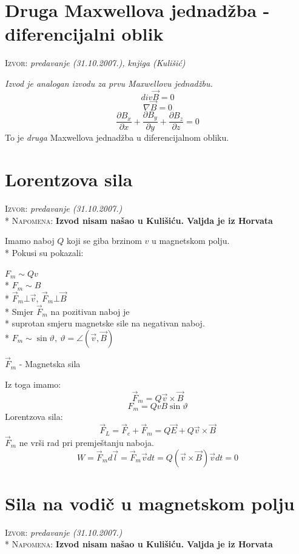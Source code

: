 \documentclass{report}
\begin{document}
\section{Druga Maxwellova jednadžba - diferencijalni oblik}
\small \textsc{Izvor:} \textit{predavanje (31.10.2007.), knjiga (Kulišić)}

\textit{Izvod je analogan izvodu za prvu Maxwellovu jednadžbu.}
$$div \vec{B} = 0$$
$$\nabla \vec{B} = 0$$
$$\frac{\partial B _x}{\partial x} + \frac{\partial B _y}{\partial y} + \frac{\partial B _z}{\partial z} = 0$$
To je \textit{druga} Maxwellova jednadžba u diferencijalnom obliku.

\section{Lorentzova sila}
\small \textsc{Izvor:} \textit{predavanje (31.10.2007.)}\\*
\small \textsc{Napomena:} \textbf{Izvod nisam našao u Kulišiću. Valjda je iz Horvata}

Imamo naboj $Q$ koji se giba brzinom $v$ u magnetskom polju.\\*
Pokusi su pokazali:
\begin{center} {
	$F _m \sim Qv$\\*
	$F _m \sim B$\\*
	$\vec{F} _m \bot \vec{v}, \: \vec{F} _m \bot \vec{B}$\\*
	Smjer $\vec{F} _m$ na pozitivan naboj je\\* suprotan smjeru magnetske sile na negativan naboj.\\*
	$F _m \sim \sin \vartheta, \: \vartheta = \angle (\vec{v}, \vec{B})$
	}
\end{center}
$\vec{F} _m$ - Magnetska sila

Iz toga imamo:
$$\vec{F} _m = Q \vec{v} \times \vec{B}$$
$$F _m = QvB \sin \vartheta $$
Lorentzova sila:
$$\vec{F} _L = \vec{F} _e + \vec{F} _m = Q \vec{E} + Q \vec{v} \times \vec{B}$$
$\vec{F} _m$ ne vrši rad pri premještanju naboja.
$$W = \vec{F} _m d\vec{l} = \vec{F} _m \vec{v} dt = Q(\vec{v} \times \vec{B}) \vec{v}dt = 0$$

\section{Sila na vodič u magnetskom polju}
\small \textsc{Izvor:} \textit{predavanje (31.10.2007.)}\\*
\small \textsc{Napomena:} \textbf{Izvod nisam našao u Kulišiću. Valjda je iz Horvata}
\end{document}
